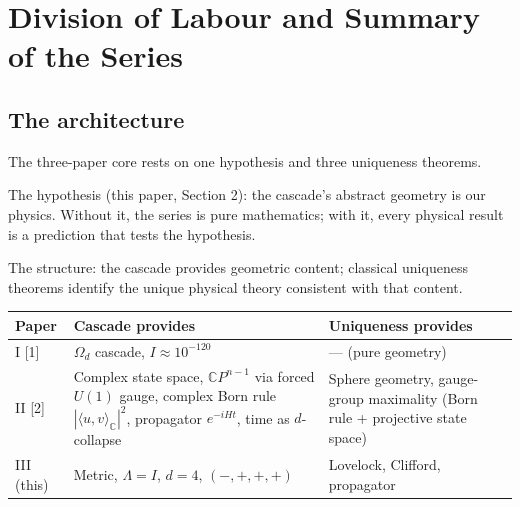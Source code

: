 \documentclass[12pt,a4paper]{article}
\begin{document}
\begin{abstract}
The cosmological constant $\Lambda = I$ is derived, not fitted. The cascade's dark
energy equation of state is $w = -1$ exactly: $\Lambda = I$ is a fixed geometric constant
with no time-evolution mechanism, so $w = -1$ by definition. The Gauss--Bonnet
correction at $d = 5$ vanishes identically by two independent mechanisms (totally
umbilic cancellation and parity of the residual integrand), confirming the prediction is
structurally stable. The supplement (Section 14) proves the compactification radius
at each step is $R_{\text{eff}}(d) = 1/\sqrt{d + 3}$ exactly (from the Beta function), and presents the
exact Lorentzian Gauss--Codazzi analysis: the cascade metric contributes $w = 1/3$
(radiation) in cascade time, and $K_{\mu\nu} = 0$ at every equatorial embedding eliminates
the extrinsic curvature mechanism. These results resolve the question of the cascade's
matter fraction: the geometric route via Gauss--Codazzi is definitively closed, and
the matter fraction $\Omega_m$ is a topological quantity determined by the Bott partition of
cascade layers, not by the cascade metric geometry.
\end{abstract}

\tableofcontents
\newpage

\section{Division of Labour and Summary of the Series}\label{sec:division-of-labour-and-summary-of-the-se}

\subsection{The architecture}

The three-paper core rests on one hypothesis and three uniqueness theorems.

The hypothesis (this paper, Section 2): the cascade's abstract geometry is our physics.
Without it, the series is pure mathematics; with it, every physical result is a prediction
that tests the hypothesis.

The structure: the cascade provides geometric content; classical uniqueness theorems
identify the unique physical theory consistent with that content.

\begin{center}
\begin{tabular}{lll}
\hline
Paper & Cascade provides & Uniqueness provides \\
\hline
I [1] & $\Omega_d$ cascade, $I \approx 10^{-120}$ & --- (pure geometry) \\
II [2] & Complex state space, $\mathbb{C}P^{n-1}$ via forced $U(1)$ gauge,
         complex Born rule $|\langle u,v\rangle_{\mathbb{C}}|^2$,
         propagator $e^{-iHt}$, time as $d$-collapse
       & Sphere geometry, gauge-group maximality (Born rule + projective
         state space) \\
III (this) & Metric, $\Lambda = I$, $d = 4$, $(-,+,+,+)$ & Lovelock, Clifford, propagator \\
\hline
\end{tabular}
\end{center}
\end{document}
